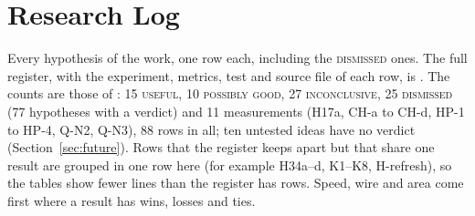 \section{Research Log}
\label{sec:log}

Every hypothesis of the work, one row each, including the \textsc{dismissed} ones. The full register, with the experiment, metrics, test and source file of each row, is . The counts are those of : 15 \textsc{useful}, 10 \textsc{possibly good}, 27 \textsc{inconclusive}, 25 \textsc{dismissed} (77 hypotheses with a verdict) and 11 measurements (H17a, CH-a to CH-d, HP-1 to HP-4, Q-N2, Q-N3), 88 rows in all; ten untested ideas have no verdict (Section~\ref{sec:future}). Rows that the register keeps apart but that share one result are grouped in one row here (for example H34a--d, K1--K8, H-refresh), so the tables show fewer lines than the register has rows. Speed, wire and area come first where a result has wins, losses and ties.

